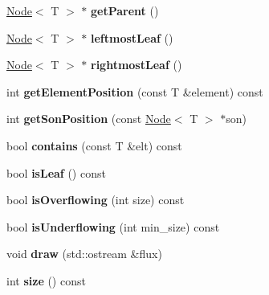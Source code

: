 \begin{DoxyCompactItemize}
\item 
\hypertarget{classNode_a1fe843bd1fa3267bcb2e587e36b55bbc}{
\hyperlink{classNode}{Node}$<$ T $>$ $\ast$ {\bfseries getParent} ()}
\label{classNode_a1fe843bd1fa3267bcb2e587e36b55bbc}

\item 
\hypertarget{classNode_ac39aa6ff487cb0f139834bac50a0d0cb}{
\hyperlink{classNode}{Node}$<$ T $>$ $\ast$ {\bfseries leftmostLeaf} ()}
\label{classNode_ac39aa6ff487cb0f139834bac50a0d0cb}

\item 
\hypertarget{classNode_a310cbefb63ef13f45e8e49b91c2fb7b0}{
\hyperlink{classNode}{Node}$<$ T $>$ $\ast$ {\bfseries rightmostLeaf} ()}
\label{classNode_a310cbefb63ef13f45e8e49b91c2fb7b0}

\item 
\hypertarget{classNode_a560dac7cb6b58cc237ded9d13a889d09}{
int {\bfseries getElementPosition} (const T \&element) const }
\label{classNode_a560dac7cb6b58cc237ded9d13a889d09}

\item 
\hypertarget{classNode_ada6ce86027688673e1ff669f0b979034}{
int {\bfseries getSonPosition} (const \hyperlink{classNode}{Node}$<$ T $>$ $\ast$son)}
\label{classNode_ada6ce86027688673e1ff669f0b979034}

\item 
\hypertarget{classNode_aca843b36a3ce0d055fd2c45d57dfdcea}{
bool {\bfseries contains} (const T \&elt) const }
\label{classNode_aca843b36a3ce0d055fd2c45d57dfdcea}

\item 
\hypertarget{classNode_a99cc5c833e35ab3038ffe6dc7c965bef}{
bool {\bfseries isLeaf} () const }
\label{classNode_a99cc5c833e35ab3038ffe6dc7c965bef}

\item 
\hypertarget{classNode_a1c3f344149070bb433bbde0edd36593d}{
bool {\bfseries isOverflowing} (int size) const }
\label{classNode_a1c3f344149070bb433bbde0edd36593d}

\item 
\hypertarget{classNode_a63144db49899831be0f33c117b395209}{
bool {\bfseries isUnderflowing} (int min\_\-size) const }
\label{classNode_a63144db49899831be0f33c117b395209}

\item 
\hypertarget{classNode_a4e37f80b186c56a4f90dc2e0be1419dc}{
void {\bfseries draw} (std::ostream \&flux)}
\label{classNode_a4e37f80b186c56a4f90dc2e0be1419dc}

\item 
\hypertarget{classNode_a8a5e65d6fb045a094506570976f10e3c}{
int {\bfseries size} () const }
\label{classNode_a8a5e65d6fb045a094506570976f10e3c}

\end{DoxyCompactItemize}

